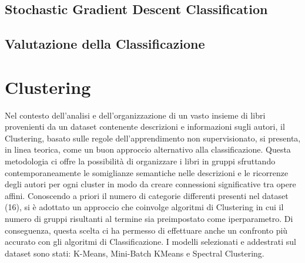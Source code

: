 \documentclass[12pt,oneside]{article}
\begin{document}
    \begin{enumerate}
    \subsection{Stochastic Gradient Descent Classification}
    \end{enumerate}

   
    
    \begin{enumerate}
    \subsection{Valutazione della Classificazione}
    \end{enumerate}


\section{Clustering}
    \begin{justify}
        Nel contesto dell'analisi e dell'organizzazione di un vasto insieme di libri provenienti da un dataset contenente descrizioni e informazioni sugli autori, il Clustering, basato sulle regole dell'apprendimento non supervisionato, si presenta, in linea teorica, come un buon approccio alternativo alla classificazione. Questa metodologia ci offre la possibilità di organizzare i libri in gruppi sfruttando contemporaneamente le somiglianze semantiche nelle descrizioni e le ricorrenze degli autori per ogni cluster in modo da creare connessioni significative tra opere affini. Conoscendo a priori il numero di categorie differenti presenti nel dataset (16), si è adottato un approccio che coinvolge algoritmi di Clustering in cui il numero di gruppi risultanti al termine sia preimpostato come iperparametro. Di conseguenza, questa scelta ci ha permesso di effettuare anche un confronto più accurato con gli algoritmi di Classificazione. I modelli selezionati e addestrati sul dataset sono stati: K-Means, Mini-Batch KMeans e Spectral Clustering.
    \end{justify}
\end{document}

